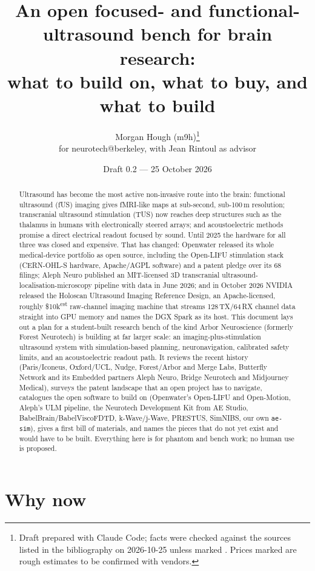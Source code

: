 \documentclass[11pt,a4paper]{article}
\title{An open focused- and functional-ultrasound bench for brain research:\\
what to build on, what to buy, and what to build}
\author{Morgan Hough (m9h)\thanks{Draft prepared with Claude Code; facts were checked against the sources listed in the bibliography on 2026-10-25 unless marked \todo{check}. Prices marked \est{} are rough estimates to be confirmed with vendors.}\\
\small for neurotech@berkeley, with Jean Rintoul as advisor}
\date{Draft 0.2 --- 25 October 2026}
\newcommand{\est}{\textsuperscript{est}}
\begin{document}
\maketitle

\begin{abstract}
Ultrasound has become the most active non-invasive route into the brain: functional ultrasound (fUS) imaging gives fMRI-like maps at sub-second, sub-100\,\textmu m resolution; transcranial ultrasound stimulation (TUS) now reaches deep structures such as the thalamus in humans with electronically steered arrays; and acoustoelectric methods promise a direct electrical readout focused by sound. Until 2025 the hardware for all three was closed and expensive. That has changed: Openwater released its whole medical-device portfolio as open source, including the Open-LIFU stimulation stack (CERN-OHL-S hardware, Apache/AGPL software) and a patent pledge over its 68 filings; Aleph Neuro published an MIT-licensed 3D transcranial ultrasound-localisation-microscopy pipeline with data in June 2026; and in October 2026 NVIDIA released the Holoscan Ultrasound Imaging Reference Design, an Apache-licensed, roughly \$10k\est{} raw-channel imaging machine that streams 128\,TX/64\,RX channel data straight into GPU memory and names the DGX Spark as its host.
This document lays out a plan for a student-built research bench of the kind Arbor Neuroscience (formerly Forest Neurotech) is building at far larger scale: an imaging-plus-stimulation ultrasound system with simulation-based planning, neuronavigation, calibrated safety limits, and an acoustoelectric readout path. It reviews the recent history (Paris/Iconeus, Oxford/UCL, Nudge, Forest/Arbor and Merge Labs, Butterfly Network and its Embedded partners Aleph Neuro, Bridge Neurotech and Midjourney Medical), surveys the patent landscape that an open project has to navigate, catalogues the open software to build on (Openwater's Open-LIFU and Open-Motion, Aleph's ULM pipeline, the Neurotech Development Kit from AE Studio, BabelBrain/BabelViscoFDTD, k-Wave/j-Wave, PRESTUS, SimNIBS, our own \texttt{ae-sim}), gives a first bill of materials, and names the pieces that do not yet exist and would have to be built. Everything here is for phantom and bench work; no human use is proposed.
\end{abstract}

\tableofcontents

\section{Why now}
\end{document}
